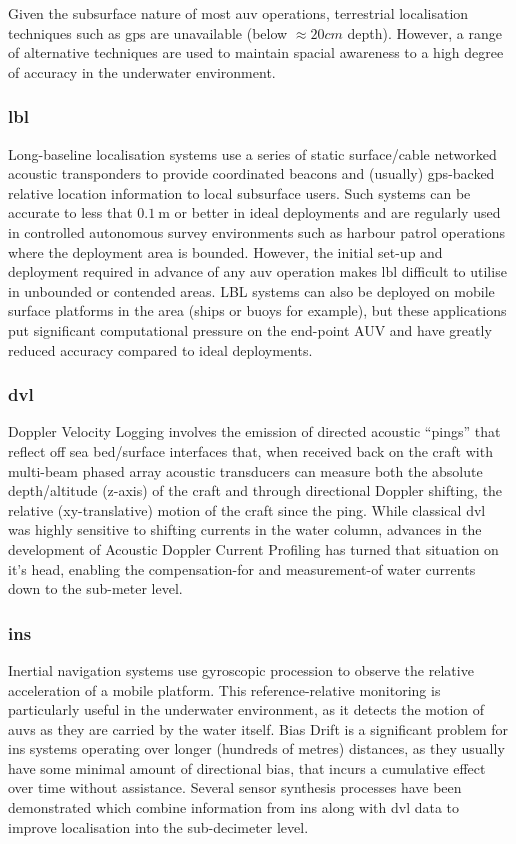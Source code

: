 Given the subsurface nature of most \gls{auv} operations, terrestrial localisation techniques such as \gls{gps} are unavailable (below $\approx 20cm$ depth). 
However, a range of alternative techniques are used to maintain spacial awareness to a high degree of accuracy in the underwater environment.
\subsubsection{\gls{lbl}}
Long-baseline localisation systems use a series of static surface/cable networked acoustic transponders to provide coordinated beacons and (usually) \gls{gps}-backed relative location information to local subsurface users. 
Such systems can be accurate to less that $0.\SI{1}{\meter}$ or better in ideal deployments and are regularly used in controlled autonomous survey environments such as harbour patrol operations where the deployment area is bounded. 
However, the initial set-up and deployment required in advance of any \gls{auv} operation makes \gls{lbl} difficult to utilise in unbounded or contended areas.
LBL systems can also be deployed on mobile surface platforms in the area (ships or buoys for example), but these applications put significant computational pressure on the end-point AUV and have greatly reduced accuracy compared to ideal deployments\cite{Matos1999}.
\subsubsection{\gls{dvl}}
Doppler Velocity Logging involves the emission of directed acoustic ``pings'' that reflect off sea bed/surface interfaces that, when received back on the craft with multi-beam phased array acoustic transducers can measure both the absolute depth/altitude (z-axis) of the craft and through directional Doppler shifting, the relative (xy-translative) motion of the craft since the ping.
While classical \gls{dvl} was highly sensitive to shifting currents in the water column, advances in the development of Acoustic Doppler Current Profiling has turned that situation on it's head, enabling the compensation-for and measurement-of water currents down to the sub-meter level\cite{Snyder2010}.
\subsubsection{\gls{ins}}
Inertial navigation systems use gyroscopic procession to observe the relative acceleration of a mobile platform.
This reference-relative monitoring is particularly useful in the underwater environment, as it detects the motion of \glspl{auv} as they are carried by the water itself.
Bias Drift is a significant problem for \gls{ins} systems operating over longer (hundreds of metres) distances, as they usually have some minimal amount of directional bias, that incurs a cumulative effect over time without assistance.
Several sensor synthesis processes have been demonstrated which combine information from \gls{ins} along with \gls{dvl} data to improve localisation into the sub-decimeter level\cite{Jalving2003,Liu2014,Allotta2015}.
